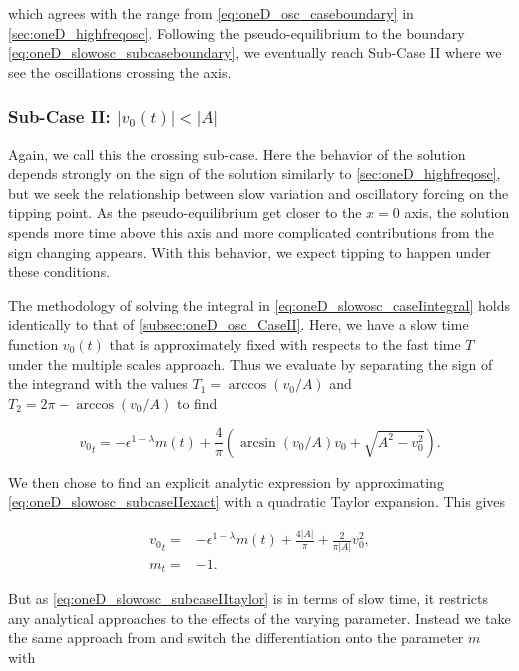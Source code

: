 which agrees with the range from \eqref{eq:oneD_osc_caseboundary} in \autoref{sec:oneD_highfreqosc}. Following the pseudo-equilibrium to the boundary \eqref{eq:oneD_slowosc_subcaseboundary}, we eventually reach Sub-Case II where we see the oscillations crossing the axis.

\subsubsection{Sub-Case II: $|v_0(t)|< |A|$}
\label{subsubsec:oneD_slowosc_subcaseII}

Again, we call this the crossing sub-case. Here the behavior of the solution depends strongly on the sign of the solution similarly to \autoref{sec:oneD_highfreqosc}, but we seek the relationship between slow variation and oscillatory forcing on the tipping point. As the pseudo-equilibrium get closer to the $x=0$ axis, the solution spends more time above this axis and more complicated contributions from the sign changing appears. With this behavior, we expect tipping to happen under these conditions.

The methodology of solving the integral in \eqref{eq:oneD_slowosc_caseIintegral} holds identically to that of \autoref{subsec:oneD_osc_CaseII}. Here, we have a slow time function $v_0(t)$ that is approximately fixed with respects to the fast time $T$ under the multiple scales approach. Thus we evaluate by separating the sign of the integrand with the values $T_1=\arccos(v_0/A)$ and $T_2 = 2\pi-\arccos(v_0/A)$ to find

\begin{equation}\label{eq:oneD_slowosc_subcaseIIexact}
{v_0}_t=-\epsilon^{1-\lambda}m(t)+\frac{4}{\pi}\left(\arcsin(v_0/A)v_0+\sqrt{A^2-v_0^2}\right).
\end{equation}

We then chose to find an explicit analytic expression by approximating \eqref{eq:oneD_slowosc_subcaseIIexact} with a quadratic Taylor expansion. This gives

\begin{equation}\label{eq:oneD_slowosc_subcaseIItaylor}
\begin{aligned}
{v_0}_t =& -\epsilon^{1-\lambda}m(t) + \frac{4|A|}{\pi} + \frac{2}{\pi |A|}v_0^2,\\
m_t =& -1.
\end{aligned}
\end{equation}

But as \eqref{eq:oneD_slowosc_subcaseIItaylor} is in terms of slow time, it restricts any analytical approaches to the effects of the varying parameter. Instead we take the same approach from \cite{haberman1979slowly} and switch the differentiation onto the parameter $m$ with

